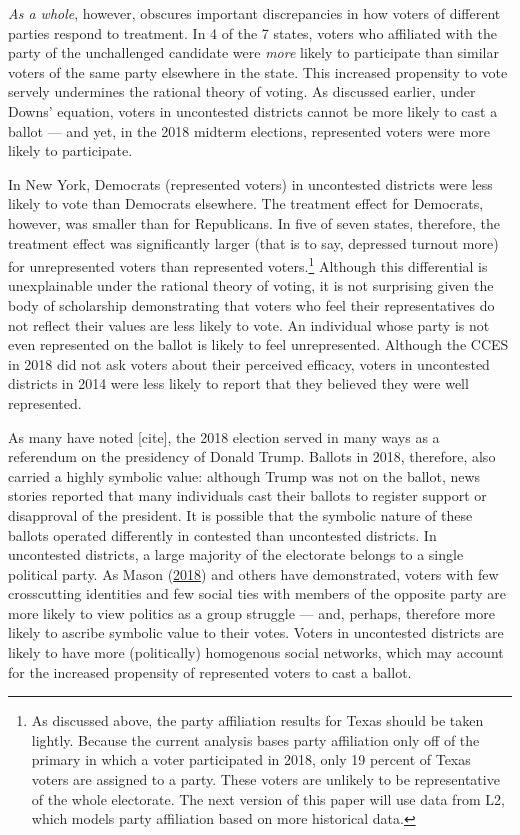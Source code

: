 \documentclass[
  12pt,
]{article}
\begin{document}
\emph{As a whole}, however, obscures important discrepancies in how voters of different parties respond to treatment. In 4 of the 7 states, voters who affiliated with the party of the unchallenged candidate were \emph{more} likely to participate than similar voters of the same party elsewhere in the state. This increased propensity to vote servely undermines the rational theory of voting. As discussed earlier, under Downs' equation, voters in uncontested districts cannot be more likely to cast a ballot --- and yet, in the 2018 midterm elections, represented voters were more likely to participate.

In New York, Democrats (represented voters) in uncontested districts were less likely to vote than Democrats elsewhere. The treatment effect for Democrats, however, was smaller than for Republicans. In five of seven states, therefore, the treatment effect was significantly larger (that is to say, depressed turnout more) for unrepresented voters than represented voters.\footnote{As discussed above, the party affiliation results for Texas should be taken lightly. Because the current analysis bases party affiliation only off of the primary in which a voter participated in 2018, only 19 percent of Texas voters are assigned to a party. These voters are unlikely to be representative of the whole electorate. The next version of this paper will use data from L2, which models party affiliation based on more historical data.} Although this differential is unexplainable under the rational theory of voting, it is not surprising given the body of scholarship demonstrating that voters who feel their representatives do not reflect their values are less likely to vote. An individual whose party is not even represented on the ballot is likely to feel unrepresented. Although the CCES in 2018 did not ask voters about their perceived efficacy, voters in uncontested districts in 2014 were less likely to report that they believed they were well represented.

As many have noted {[}cite{]}, the 2018 election served in many ways as a referendum on the presidency of Donald Trump. Ballots in 2018, therefore, also carried a highly symbolic value: although Trump was not on the ballot, news stories reported that many individuals cast their ballots to register support or disapproval of the president. It is possible that the symbolic nature of these ballots operated differently in contested than uncontested districts. In uncontested districts, a large majority of the electorate belongs to a single political party. As Mason (\protect\hyperlink{ref-Mason2018}{2018}) and others have demonstrated, voters with few crosscutting identities and few social ties with members of the opposite party are more likely to view politics as a group struggle --- and, perhaps, therefore more likely to ascribe symbolic value to their votes. Voters in uncontested districts are likely to have more (politically) homogenous social networks, which may account for the increased propensity of represented voters to cast a ballot.
\end{document}
